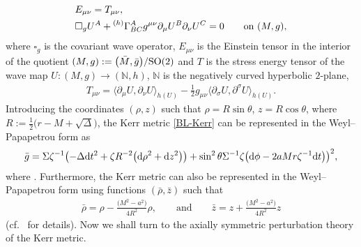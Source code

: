 \documentclass[pdftex]{sigma}
\def\ptl{\partial}%
\def\ip#1#2{\langle#1,#2\rangle}
\newcommand{\leftexp}[2]{{\vphantom{#2}}^{#1}{#2}}
\def\halb{\frac{1}{2}}%
\renewcommand{\r}{\rho}
\numberwithin{equation}{section}
\begin{document}
\begin{subequations} \label{ewm-system}
\begin{align}
&E_{\mu \nu} = T_{\mu \nu}, \\
&\square_g U^A + \leftexp{(h)}{\Gamma}^A_{BC} g^{\mu \nu} \ptl_\mu U^B \ptl_\nu U^C= 0 \qquad \text{on} \ (M, g),
\end{align}
\end{subequations}
where $\square_g$ is the covariant wave operator, $E_{\mu \nu}$ is the Einstein tensor in the interior of the quotient $(M, g) := \bigl(\bar{M}, \bar{g}\bigr)/ {\rm SO}(2)$ and $T$ is the stress energy tensor of the wave map $U \colon (M, g) \to (\mathbb{N}, h)$, $\mathbb{N}$ is the negatively curved hyperbolic $2$-plane,
\begin{align*}
T_{\mu \nu} = \ip{\ptl_\mu U} {\ptl_\nu U }_{h(U)} - \halb g_{\mu \nu} \ip{\ptl_\sigma U}{ \ptl^\sigma U}_{h(U)}.
\end{align*}
Introducing the coordinates $(\r, z)$ such that $\r = R \sin \theta$, $z= R \cos
\theta$, where $R := \halb \bigl(r-M+ \sqrt{\Delta}\bigr)$, the Kerr metric \eqref{BL-Kerr} can be represented in the Weyl--Papapetrou form as
\begin{align*}
\bar{g} = \Sigma \zeta^{-1} \bigl(-\Delta {\rm d}t^2 + \zeta R^{-2} \bigl({\rm d}\r^2 + {\rm d}z^2\bigr)\bigr) + \sin^2\theta \Sigma^{-1} \zeta
\bigl({\rm d}\phi - 2aMr \zeta^{-1} {\rm d}t\bigr)\bigr)^2,
\end{align*}
where . Furthermore, the Kerr metric can also be represented in the Weyl--Papapetrou form using functions $(\bar{\r}, \bar{z})$
such that
\begin{align*}
\bar{\r} = \r - \frac{\bigl(M^2 -a^2\bigr)}{4 R^2}\r, \qquad \text{and} \qquad \bar{z} = z + \frac{\bigl(M^2 -a^2\bigr)}{4 R^2}z
\end{align*}
(cf.\ \cite[Appendix A]{GM17_gentitle} for details). Now we shall turn to the axially symmetric perturbation theory of the Kerr metric.
\end{document}
